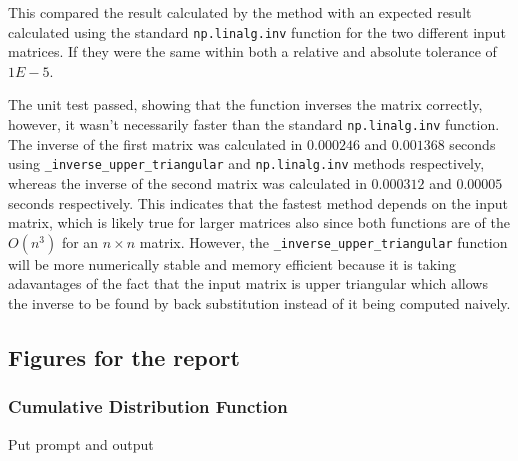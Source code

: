 \documentclass[12pt]{article}
\begin{document}
    This compared the result calculated by the method with an expected result calculated using the standard \texttt{np.linalg.inv} function for the two different input matrices.
    If they were the same within both a relative and absolute tolerance of $1E-5.$

    The unit test passed, showing that the function inverses the matrix correctly, however, it wasn't necessarily faster than the standard \texttt{np.linalg.inv} function.
    The inverse of the first matrix was calculated in $0.000246$ and $0.001368$ seconds using \texttt{\_inverse\_upper\_triangular} and \texttt{np.linalg.inv} methods respectively, whereas the inverse of the second matrix was calculated in $0.000312$ and $0.00005$ seconds respectively.
    This indicates that the fastest method depends on the input matrix, which is likely true for larger matrices also since both functions are of the $O(n^3)$ for an $n \times n$ matrix.
    However, the \texttt{\_inverse\_upper\_triangular} function will be more numerically stable and memory efficient because it is taking adavantages of the fact that the input matrix is upper triangular which allows the inverse to be found by back substitution instead of it being computed naively.

    \subsection{Figures for the report}
    \subsubsection{Cumulative Distribution Function}
    Put prompt and output


    \printbibliography
\end{document}
